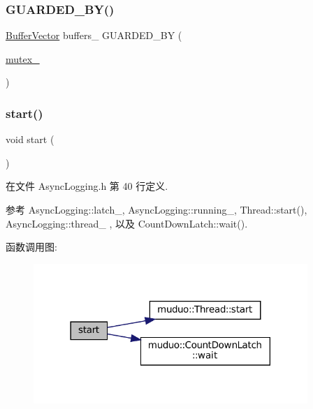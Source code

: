 \subsubsection{\texorpdfstring{G\+U\+A\+R\+D\+E\+D\+\_\+\+B\+Y()}{GUARDED\_BY()}\hspace{0.1cm}{\footnotesize\ttfamily [4/4]}}
{\footnotesize\ttfamily \hyperlink{classmuduo_1_1AsyncLogging_ab5cac8d284abaa58e906d90e6dbc11e3}{Buffer\+Vector} buffers\+\_\+ G\+U\+A\+R\+D\+E\+D\+\_\+\+BY (\begin{DoxyParamCaption}\item[{\hyperlink{classmuduo_1_1AsyncLogging_ab9ed43ba5a78211f8947e85d98e1dffb}{mutex\+\_\+}}]{ }\end{DoxyParamCaption})\hspace{0.3cm}{\ttfamily [private]}}

\mbox{\label{classmuduo_1_1AsyncLogging_a60de64d75454385b23995437f1d72669}} 
\subsubsection{\texorpdfstring{start()}{start()}}
{\footnotesize\ttfamily void start (\begin{DoxyParamCaption}{ }\end{DoxyParamCaption})\hspace{0.3cm}{\ttfamily [inline]}}



在文件 Async\+Logging.\+h 第 40 行定义.



参考 Async\+Logging\+::latch\+\_\+, Async\+Logging\+::running\+\_\+, Thread\+::start(), Async\+Logging\+::thread\+\_\+ , 以及 Count\+Down\+Latch\+::wait().

函数调用图\+:
\nopagebreak
\begin{figure}[H]
\begin{center}
\leavevmode
\includegraphics[width=294pt]{classmuduo_1_1AsyncLogging_a60de64d75454385b23995437f1d72669_cgraph}
\end{center}
\end{figure}
\mbox{\label{classmuduo_1_1AsyncLogging_a849302529291497f64017bf57efb5606}} 
